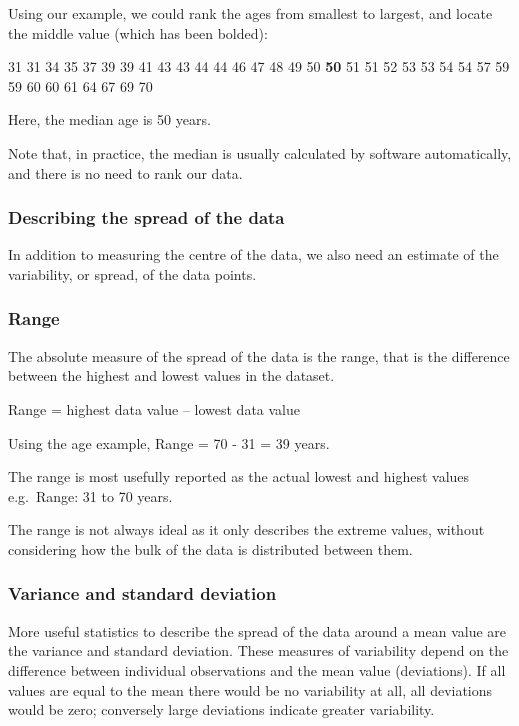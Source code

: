 \documentclass[
  a4paper,
]{memoir}
\begin{document}
Using our example, we could rank the ages from smallest to largest, and
locate the middle value (which has been bolded):

31 31 34 35 37 39 39 41 43 43 44 44 46 47 48 49 50 \textbf{50} 51 51 52
53 53 54 54 57 59 59 60 60 61 64 67 69 70

Here, the median age is 50 years.

Note that, in practice, the median is usually calculated by software
automatically, and there is no need to rank our data.

\subsubsection{Describing the spread of the
data}\label{describing-the-spread-of-the-data}

In addition to measuring the centre of the data, we also need an
estimate of the variability, or spread, of the data points.

\subsubsection{Range}\label{range}

The absolute measure of the spread of the data is the range, that is the
difference between the highest and lowest values in the dataset.

Range = highest data value -- lowest data value

Using the age example, Range = 70 - 31 = 39 years.

The range is most usefully reported as the actual lowest and highest
values e.g.~Range: 31 to 70 years.

The range is not always ideal as it only describes the extreme values,
without considering how the bulk of the data is distributed between
them.

\subsubsection{Variance and standard
deviation}\label{variance-and-standard-deviation}

More useful statistics to describe the spread of the data around a mean
value are the variance and standard deviation. These measures of
variability depend on the difference between individual observations and
the mean value (deviations). If all values are equal to the mean there
would be no variability at all, all deviations would be zero; conversely
large deviations indicate greater variability.
\end{document}
